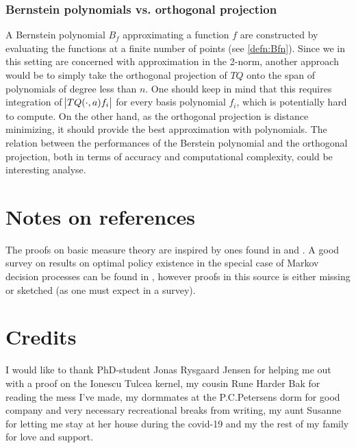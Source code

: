\subsubsection{Bernstein polynomials vs. orthogonal projection}
A Bernstein polynomial $B_f$ approximating a function $f$
are constructed by evaluating the
functions at a finite number of points (see \cref{defn:Bfn}).
Since we in this setting are concerned with approximation in the 2-norm,
another approach would be to simply take the orthogonal projection of
$TQ$ onto the span of polynomials of degree less than $n$.
One should keep in mind that this requires integration of
$\abs{TQ(\cdot, a) f_i}$ for every basis polynomial $f_i$,
which is potentially hard to compute.
On the other hand, as the orthogonal projection is distance minimizing,
it should provide the best approximation with polynomials.
The relation between the performances of the Berstein polynomial
and the orthogonal projection, both in terms of accuracy and 
computational complexity, could be interesting analyse.

\section{Notes on references}
The proofs on basic measure theory are inspired by ones found in
 and .
A good survey on results on optimal policy existence in the special case
of Markov decision processes can be found in ,
however proofs in this source is either missing or sketched
(as one must expect in a survey).

\section{Credits}
I would like to thank PhD-student Jonas Rysgaard Jensen for helping me
out with a proof on the Ionescu Tulcea kernel,
my cousin Rune Harder Bak for reading the mess I've made,
my dormmates at the P.C.Petersens dorm for good company and very necessary
recreational breaks from writing,
my aunt Susanne for letting me stay at her house during the covid-19 and
my the rest of my family for love and support.

